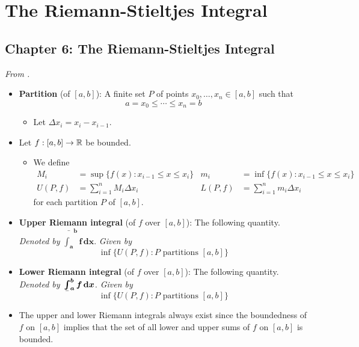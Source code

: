 \documentclass[../../notes.tex]{subfiles}
\begin{document}
\chapter{The Riemann-Stieltjes Integral}
\section{Chapter 6: The Riemann-Stieltjes Integral}
\emph{From \textcite{bib:Rudin}.}
\begin{itemize}
    \item {}\textbf{Partition} (of $[a,b]$): A finite set $P$ of points $x_0,\dots,x_n\in[a,b]$ such that
    \begin{equation*}
        a = x_0 \leq \cdots \leq x_n = b
    \end{equation*}
    \begin{itemize}
        \item Let $\Delta x_i=x_i-x_{i-1}$.
    \end{itemize}
    \item Let $f:[a,b]\to\mathbb{R}$ be bounded.
    \begin{itemize}
        \item We define
        \begin{align*}
            M_i &= \sup\{f(x):x_{i-1}\leq x\leq x_i\}&
            m_i &= \inf\{f(x):x_{i-1}\leq x\leq x_i\}\\
            U(P,f) &= \sum_{i=1}^nM_i\Delta x_i&
            L(P,f) &= \sum_{i=1}^nm_i\Delta x_i
        \end{align*}
        for each partition $P$ of $[a,b]$.
    \end{itemize}
    \item \textbf{Upper Riemann integral} (of $f$ over $[a,b]$): The following quantity. \emph{Denoted by} $\bar{\bm{\int_a}}^{\bm{b}}\bm{f\,\textbf{d}x}$. \emph{Given by}
    \begin{equation*}
        \inf\{U(P,f):P\text{ partitions }[a,b]\}
    \end{equation*}
    \item \textbf{Lower Riemann integral} (of $f$ over $[a,b]$): The following quantity. \emph{Denoted by} $\underaccent{\bar}{\bm{\int^b}}_{\bm{a}}\bm{f\,\textbf{d}x}$. \emph{Given by}
    \begin{equation*}
        \inf\{U(P,f):P\text{ partitions }[a,b]\}
    \end{equation*}
    \item The upper and lower Riemann integrals always exist since the boundedness of $f$ on $[a,b]$ implies that the set of all lower and upper sums of $f$ on $[a,b]$ is bounded.

\end{itemize}
\end{document}
